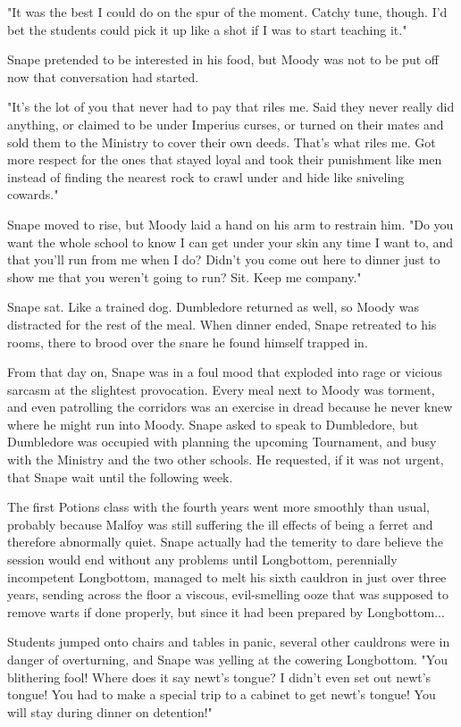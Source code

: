 "It was the best I could do on the spur of the moment. Catchy tune, though. I'd bet the students could pick it up like a shot if I was to start teaching it."

Snape pretended to be interested in his food, but Moody was not to be put off now that conversation had started.

"It's the lot of you that never had to pay that riles me. Said they never really did anything, or claimed to be under Imperius curses, or turned on their mates and sold them to the Ministry to cover their own deeds. That's what riles me. Got more respect for the ones that stayed loyal and took their punishment like men instead of finding the nearest rock to crawl under and hide like sniveling cowards."

Snape moved to rise, but Moody laid a hand on his arm to restrain him. "Do you want the whole school to know I can get under your skin any time I want to, and that you'll run from me when I do? Didn't you come out here to dinner just to show me that you weren't going to run? Sit. Keep me company."

Snape sat. Like a trained dog. Dumbledore returned as well, so Moody was distracted for the rest of the meal. When dinner ended, Snape retreated to his rooms, there to brood over the snare he found himself trapped in.

From that day on, Snape was in a foul mood that exploded into rage or vicious sarcasm at the slightest provocation. Every meal next to Moody was torment, and even patrolling the corridors was an exercise in dread because he never knew where he might run into Moody. Snape asked to speak to Dumbledore, but Dumbledore was occupied with planning the upcoming Tournament, and busy with the Ministry and the two other schools. He requested, if it was not urgent, that Snape wait until the following week.

The first Potions class with the fourth years went more smoothly than usual, probably because Malfoy was still suffering the ill effects of being a ferret and therefore abnormally quiet. Snape actually had the temerity to dare believe the session would end without any problems until Longbottom, perennially incompetent Longbottom, managed to melt his sixth cauldron in just over three years, sending across the floor a viscous, evil-smelling ooze that was supposed to remove warts if done properly, but since it had been prepared by Longbottom...

Students jumped onto chairs and tables in panic, several other cauldrons were in danger of overturning, and Snape was yelling at the cowering Longbottom. "You blithering fool! Where does it say newt's tongue? I didn't even set out newt's tongue! You had to make a special trip to a cabinet to get newt's tongue! You will stay during dinner on detention!"

